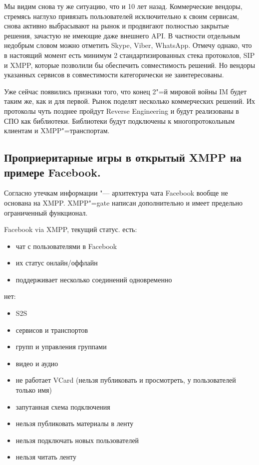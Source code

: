 \documentclass[10pt, a5paper]{article}
\begin{document}
Мы видим снова ту же ситуацию, что и 10 лет назад. Коммерческие вендоры, стремясь наглухо привязать пользователей исключительно к своим сервисам, снова активно выбрасывают на рынок и продвигают полностью закрытые решения, зачастую не имеющие даже внешнего API. В частности отдельным недобрым словом можно отметить Skype, Viber, WhatsApp.  Отмечу однако, что в настоящий момент есть минимум 2 стандартизированных стека протоколов, SIP и XMPP, которые позволили бы обеспечить совместимость решений.  Но вендоры указанных сервисов в совместимости категорически не заинтересованы.

Уже сейчас появились признаки того, что конец 2"=й мировой войны IM будет таким же, как и для первой. Рынок поделят несколько коммерческих решений. Их  протоколы чуть позднее пройдут Reverse Engineering и будут реализованы в СПО как библиотеки. Библиотеки будут подключены  к многопротокольным клиентам и XMPP"=транспортам.

\subsection{Проприеритарные игры в открытый XMPP на примере Facebook.}

Согласно утечкам информации "--- архитектура чата Facebook вообще не основана на XMPP. XMPP"=gate написан дополнительно и имеет предельно ограниченный функционал.

Facebook via XMPP, текущий статус.
есть:

\begin{itemize}
  \item чат с пользователями в Facebook
  \item их статус онлайн/оффлайн
  \item поддерживает несколько соединений одновременно
\end{itemize}

нет:

\begin{itemize}
  \item S2S
  \item сервисов и транспортов
  \item групп и управления группами
  \item видео и аудио
  \item не работает VCard (нельзя публиковать и просмотреть, у пользователей только имя)
  \item запутанная схема подключения
  \item нельзя публиковать материалы в ленту
  \item нельзя подключать новых пользователей
  \item нельзя читать ленту
\end{itemize}
\end{document}
